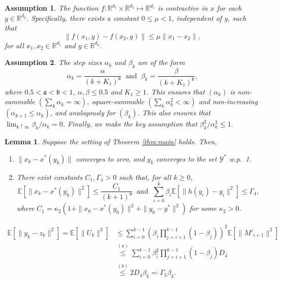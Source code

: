 \documentclass[10pt,a4paper]{amsart}
\newtheorem{assumption}{Assumption}
\newtheorem{lemma}{Lemma}
\newcommand{\EE}{\mathbb{E}}
\newcommand{\RR}{\mathbb{R}}
\newcommand{\Ystar}{\mathcal{Y}^*}
\newcommand{\afrak}{\mathfrak{a}}
\newcommand{\bfrak}{\mathfrak{b}}
\newcommand{\xstar}{x^*}
\newcommand{\ystar}{y^*}
\begin{document}
\begin{assumption}\label{f-contrac}
The function $f:\RR^{d_1}\times \RR^{d_2}\mapsto \RR^{d_1}$ is contractive in $x$ for each $y\in\RR^{d_2}$. Specifically, there exists a constant $0\leq \mu<1$, independent of $y$, such that
   $$\|f(x_1,y)-f(x_2,y)\|\leq \mu \|x_1-x_2\|,$$
for all $x_1,x_2\in\RR^{d_1}$ and $y\in\RR^{d_2}$.
\end{assumption}

\begin{assumption}\label{assu:stepsize}
The step sizes $\alpha_k$ and $\beta_k$ are of the form $$\alpha_k=\frac{\alpha}{(k+K_1)^{\afrak}}\;\;\text{and}\;\;\beta_k=\frac{\beta}{(k+K_1)^{\bfrak}},$$
where $0.5<\afrak<\bfrak<1$, $\alpha,\beta\leq 0.5$ and $K_1\geq 1$. This ensures that $(\alpha_k)$ is non-summable $(\sum_k\alpha_k=\infty)$, square-summable $(\sum_k\alpha^2_k<\infty)$ and non-increasing $(\alpha_{k+1}\leq \alpha_k)$, and analogously for $(\beta_k)$. This also ensures that $\lim_{k\uparrow\infty} \beta_k/\alpha_k=0$. Finally, we make the key assumption that 
$\beta_k^2/\alpha_k^3\leq 1.$
\end{assumption}

\begin{lemma}\label{lemma:wp1_and_bound}
    Suppose the setting of Theorem \ref{thm:main} holds. Then,
    \begin{enumerate}[label=\alph*)]
        \item $\|x_k-\xstar(y_k)\|$ converges to zero, and $y_k$ converges to the set $\Ystar$ w.p.\ 1.
        \item There exist constants $C_1,\Gamma_4>0$ such that, for all $k\geq 0$,
        $$\EE[\|x_k-\xstar(y_k)\|^2]\leq \frac{C_1}{(k+1)^{\afrak}}\;\;\text{and}\;\;\sum_{i=0}^k\beta_i\EE\left[\|h(y_i)-y_i\|^2\right]\leq \Gamma_4,$$
        where $C_1=\kappa_2\left(1+\|x_0-\xstar(y_0)\|^2+\|y_0-\ystar\|^2\right)$ for some $\kappa_2>0$.
    \end{enumerate}
\end{lemma}

\begin{align}\label{bound-U}
    \EE[\|y_k-z_k\|^2]= \EE\left[\|U_k\|^2\right]&\leq \sum_{i=0}^{k-1} \left(\beta_i\prod_{j=i+1}^{k-1}(1-\beta_j)\right)^2\EE\left[\|M'_{i+1}\|^2\right]\nonumber\\
    &\stackrel{(a)}{\leq} \sum_{i=0}^{k-1} \beta_i^2\prod_{j=i+1}^{k-1}(1-\beta_j) D_4\nonumber\\
    &\stackrel{(b)}{\leq} 2D_4\beta_k\eqqcolon \Gamma_5\beta_k.
\end{align}
\end{document}
